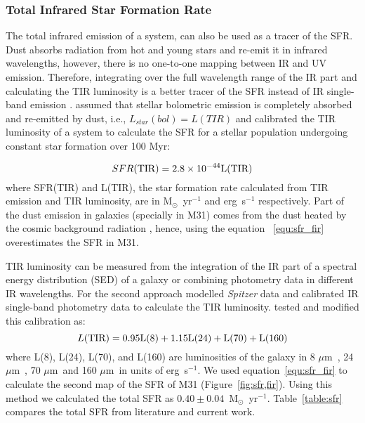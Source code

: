 \documentclass[useAMS,usenatbib]{mn2e}
\newcommand \um    {$\mu$m\ }
\newcommand \Spitzer {{\it Spitzer }}
\begin{document}
\subsubsection{Total Infrared Star Formation Rate}
\label{sec:sfr_fir}
The total infrared emission of a system, can also be used as a tracer of the SFR. Dust absorbs radiation from hot and young stars and re-emit it in infrared wavelengths, however, there is no one-to-one mapping between IR and UV emission. Therefore, integrating over the full wavelength range of the IR part and calculating the TIR luminosity is a better tracer of the SFR instead of IR single-band emission \citep{Calzetti13}. \cite{Calzetti13} assumed that stellar bolometric emission is completely absorbed and re-emitted by dust, i.e., $L_{star}(bol) = L(TIR)$ and calibrated the TIR luminosity of a system to calculate the SFR for a stellar population undergoing constant star formation over 100 Myr:

\begin{equation}
\label{equ:sfr_fir}
SFR(\rm TIR) = 2.8 \times10^{-44}L(\rm TIR)
\end{equation}
where SFR(TIR) and L(TIR), the star formation rate calculated from TIR emission and TIR luminosity, are in M$_{\odot}$~yr$^{-1}$ and erg~s$^{-1}$ respectively. Part of the dust emission in galaxies (specially in M31) comes from the dust heated by the cosmic background radiation \citep[e.g.][]{Dole06, Calzetti13, Mattsson14}, hence, using the equation ~\ref{equ:sfr_fir} overestimates the SFR in M31.  

TIR luminosity can be measured from the integration of the IR part of a spectral energy distribution (SED) of a galaxy or combining photometry data in different IR wavelengths. For the second approach \cite{Draine07} modelled \Spitzer data and calibrated IR single-band photometry data to calculate the TIR luminosity. \cite{Boquien10} tested and modified this calibration as:
\begin{equation}
 \label{equ: TIR}
L(\rm TIR) = 0.95L(8) + 1.15L(24) + L(70) + L(160)
\end{equation}
where L(8), L(24), L(70), and L(160) are luminosities of the galaxy in 8 \um, 24 \um, 70 \um and 160 \um in units of erg~s$^{-1}$. We used equation~\ref{equ:sfr_fir} to calculate the second map of the SFR of M31 (Figure~\ref{fig:sfr,fir}). Using this method we calculated the total SFR as $0.40 \pm 0.04$~M$_{\odot}$~yr$^{-1}$. Table~\ref{table:sfr} compares the total SFR from literature and current work. 
\end{document}

